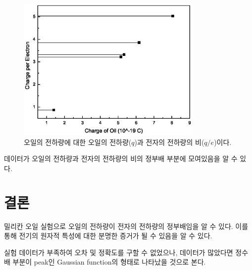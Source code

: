 \documentclass[a4paper, 10pt, nanum]{CSUniSchoolLabReport}
\begin{document}
\begin{figure}[htb!]
	\centering
	\includegraphics[viewport=1mm 99mm 180mm 200mm, width=9cm, clip=true]{data_graph.eps}
	\caption{오일의 전하량에 대한 오일의 전하량($q$)과 전자의 전하량의 비($q/e$)이다.}
	\label{fig:exam}
\end{figure}

데이터가 오일의 전하량과 전자의 전하량의 비의 정부배 부분에 모여있음을 알 수 있다.


\section{결론}

밀리칸 오일 실험으로 오일의 전하량이 전자의 전하량의 정부배임을 알 수 있다. 이를 통해 전기의 원자적 특성에 대한 분명한 증거가 될 수 있음을 알 수 있다.

실험 데이터가 부족하여 오차 및 정확도를 구할 수 없었으나, 데이터가 많았다면 정수배 부분이 peak인 Gaussian function의 형태로 나타났을 것으로 본다.


\printbibliography %

\end{document}
